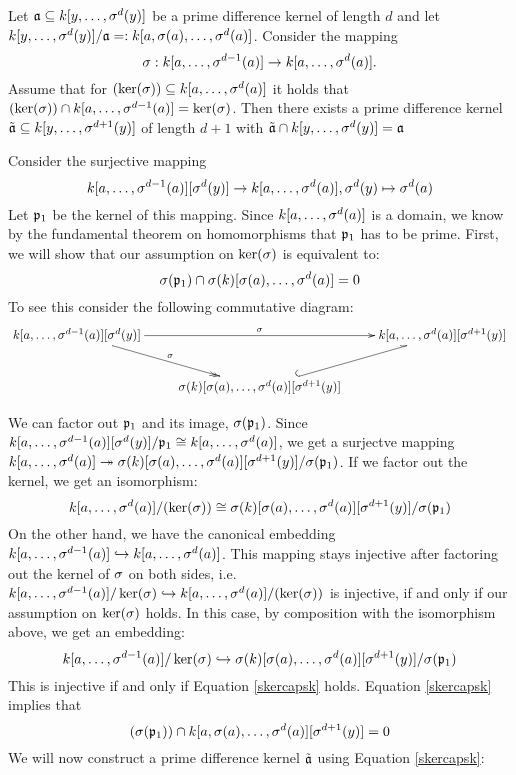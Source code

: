  
\begin{prop}
Let $\mathfrak{a} \subseteq k[y,\ldots,\sigma^d(y)]$ be a prime difference kernel of length $d$ and let $k[y,\ldots,\sigma^d(y)]/\mathfrak{a} =: k[a,\sigma(a),\ldots,\sigma^d(a)]$. Consider the mapping 
\[ \sigma: k[a,\ldots,\sigma^{d-1}(a)] \rightarrow k[a,\ldots,\sigma^d(a)]. \]
Assume that for $(\operatorname{ker}(\sigma)) \subseteq k[a,\ldots,\sigma^d(a)]$ it holds that $(\operatorname{ker}(\sigma)) \cap k[a,\ldots,\sigma^{d-1}(a)] = \operatorname{ker}(\sigma)$. 
Then there exists a prime difference kernel $\tilde {\mathfrak{a}} \subseteq k[y,\ldots,\sigma^{d+1}(y)]$ of length $d+1$ with $\tilde {\mathfrak{a}} \cap k[y,\ldots,\sigma^d(y)] = \mathfrak{a}$
\begin{bew}
Consider the surjective mapping 
\[ k[a,\ldots,\sigma^{d-1}(a)][\sigma^d(y)] \rightarrow k[a,\ldots,\sigma^d(a)], \sigma^d(y) \mapsto \sigma^d(a) \]
Let $\mathfrak{p}_1$ be the kernel of this mapping. Since $k[a,\ldots,\sigma^d(a)]$ is a domain, we know by the fundamental theorem on homomorphisms that $\mathfrak{p}_1$ has to be prime. 
First, we will show that our assumption on $\operatorname{ker}(\sigma)$ is equivalent to:
\begin{equation}\label{skercapsk} \sigma(\mathfrak{p}_1) \cap \sigma(k)[\sigma(a),\ldots,\sigma^d(a)] = 0 \end{equation}
To see this consider the following commutative diagram:
\[
\begin{xy}
 \xymatrix{
      k[a,\ldots,\s^{d-1}(a)][\s^d(y)] \ar[rr]^\s \ar@{->>}[rd]^\s  &     &  k[a,\ldots,\s^d(a)][\s^{d+1}(y)]   \\
      &  \s(k)[\s(a),\ldots,\s^d(a)][\s^{d+1}(y)] \ar@^{(->}[ur] &  }
\end{xy}
\]

We can factor out $\mathfrak{p}_1$ and its image, $\sigma(\mathfrak{p}_1)$. Since $k[a,\ldots,\sigma^{d-1}(a)][\sigma^d(y)] / \mathfrak{p}_1 \cong k[a,\ldots, \sigma^d(a)]$,
we get a surjectve mapping $k[a,\ldots, \sigma^d(a)] \twoheadrightarrow \sigma(k)[\sigma(a),\ldots,\sigma^d(a)][\sigma^{d+1}(y)]/\sigma(\mathfrak{p}_1)$.
If we factor out the kernel, we get an isomorphism:
\[ k[a,\ldots, \sigma^d(a)]/(\operatorname{ker}(\sigma)) \cong \sigma(k)[\sigma(a),\ldots,\sigma^d(a)][\sigma^{d+1}(y)]/\sigma(\mathfrak{p}_1)\]
On the other hand, we have the canonical embedding $k[a,\ldots,\sigma^{d-1}(a)] \hookrightarrow k[a,\ldots,\sigma^{d}(a)]$.
This mapping stays injective after factoring out the kernel of $\sigma$ on both sides, 
i.e. $k[a,\ldots,\sigma^{d-1}(a)]/\operatorname{ker}(\sigma) \hookrightarrow k[a,\ldots,\sigma^{d}(a)]/(\operatorname{ker}(\sigma))$ is injective, if and only if our assumption on $\ker(\sigma)$ holds.
In this case, by composition with the isomorphism above, we get an embedding:
\[ k[a,\ldots,\sigma^{d-1}(a)]/\operatorname{ker}(\sigma) \hookrightarrow \sigma(k)[\sigma(a),\ldots,\sigma^d(a)][\sigma^{d+1}(y)]/\sigma(\mathfrak{p}_1) \]
This is injective if and only if Equation \ref{skercapsk} holds.
Equation \ref{skercapsk} implies that
\begin{equation}\label{skercapk}
(\sigma(\mathfrak{p}_1)) \cap k[a,\sigma(a),\ldots,\sigma^d(a)][\sigma^{d+1}(y)] = 0
\end{equation}
We will now construct a prime difference kernel $\tilde {\mathfrak{a}}$ using Equation \ref{skercapsk}:


\end{bew}
\end{prop}
